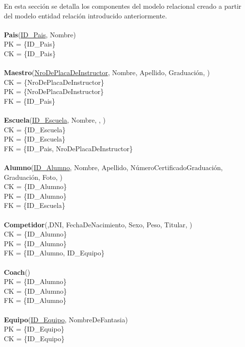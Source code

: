 En esta sección se detalla los componentes del modelo relacional creado a partir del modelo entidad relación introducido anteriormente.\\
\\
\textbf{Pais}(\uline{ID\_Pais}, Nombre)\\
PK = \{ID\_Pais\}\\
CK = \{ID\_Pais\}\\
\\
\textbf{Maestro}(\uline{NroDePlacaDeInstructor}, Nombre, Apellido, Graduación, )\\
CK = \{NroDePlacaDeInstructor\}\\
PK = \{NroDePlacaDeInstructor\}\\
FK = \{ID\_Pais\}\\
\\
\textbf{Escuela}(\uline{ID\_Escuela}, Nombre, , )\\
CK = \{ID\_Escuela\}\\
PK = \{ID\_Escuela\}\\
FK = \{ID\_Pais, NroDePlacaDeInstructor\}\\
\\
\textbf{Alumno}(\uline{ID\_Alumno}, Nombre, Apellido, NúmeroCertificadoGraduación, Graduación, Foto, )\\
CK = \{ID\_Alumno\}\\
PK = \{ID\_Alumno\}\\
FK = \{ID\_Escuela\}\\
\\
\textbf{Competidor}(\uline{},DNI, FechaDeNacimiento, Sexo, Peso, Titular, )\\
CK = \{ID\_Alumno\}\\
PK = \{ID\_Alumno\}\\
FK = \{ID\_Alumno, ID\_Equipo\}\\
\\
\textbf{Coach}(\uline{})\\
PK = \{ID\_Alumno\}\\
CK = \{ID\_Alumno\}\\
FK = \{ID\_Alumno\}\\
\\
\textbf{Equipo}(\uline{ID\_Equipo}, NombreDeFantasia)\\
PK = \{ID\_Equipo\}\\
CK = \{ID\_Equipo\}\\
\\
